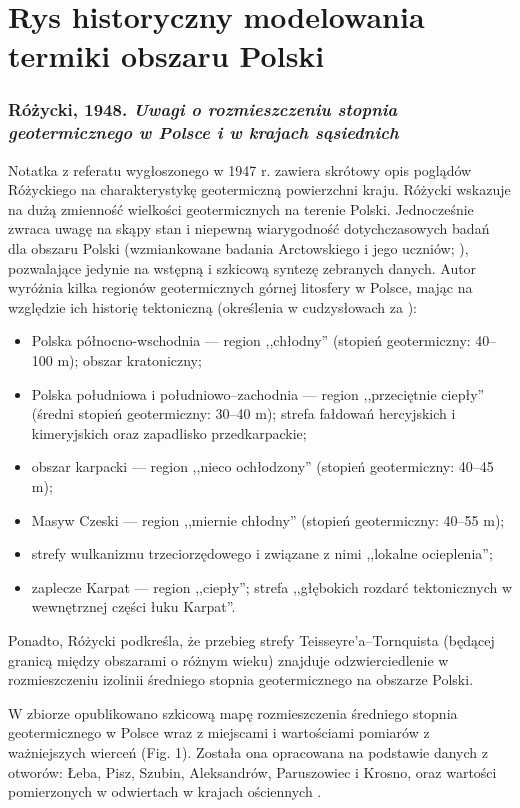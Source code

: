 \documentclass[11.5pt,twoside]{report}
\newcommand{\ct}[1]{\ignorespaces} %
\begin{document}
\section{Rys historyczny modelowania termiki obszaru Polski}

\subsubsection{Różycki, 1948. \textit{Uwagi o rozmieszczeniu stopnia geotermicznego w Polsce i w krajach sąsiednich}} \nocite{Rozycki.1948}
Notatka z referatu wygłoszonego w 1947 r. zawiera skrótowy opis poglądów Różyckiego na charakterystykę geotermiczną powierzchni kraju. Różycki wskazuje na dużą zmienność wielkości geotermicznych na terenie Polski. Jednocześnie zwraca uwagę na skąpy stan i niepewną wiarygodność dotychczasowych badań dla obszaru Polski (wzmiankowane badania Arctowskiego i jego uczniów; \ct{cite{bibid}}), pozwalające jedynie na wstępną i szkicową syntezę zebranych danych. Autor wyróżnia kilka regionów geotermicznych górnej litosfery w Polsce, mając na względzie ich historię tektoniczną (określenia w cudzysłowach za \cite{Rozycki.1948}):
 \begin{itemize}[nolistsep]
 	\item Polska północno-wschodnia --- region ,,chłodny'' (stopień geotermiczny: 40--100 m); obszar kratoniczny;
 	\item Polska południowa i południowo--zachodnia --- region ,,przeciętnie ciepły'' (średni stopień geotermiczny: 30--40 m); strefa fałdowań hercyjskich i kimeryjskich oraz zapadlisko przedkarpackie;
 	\item obszar karpacki --- region ,,nieco ochłodzony'' (stopień geotermiczny: 40--45 m);
 	\item Masyw Czeski --- region ,,miernie chłodny'' (stopień geotermiczny: 40--55 m);
 	\item strefy wulkanizmu trzeciorzędowego i związane z nimi ,,lokalne ocieplenia'';
 	\item zaplecze Karpat --- region ,,ciepły''; strefa ,,głębokich rozdarć tektonicznych w wewnętrznej części łuku Karpat''.
 \end{itemize}
Ponadto, Różycki podkreśla, że przebieg strefy Teisseyre'a--Tornquista (będącej granicą między obszarami o różnym wieku) znajduje odzwierciedlenie w rozmieszczeniu izolinii średniego stopnia geotermicznego na obszarze Polski.
 
W zbiorze opublikowano szkicową mapę rozmieszczenia średniego stopnia geotermicznego w Polsce wraz z miejscami i wartościami pomiarów z ważniejszych wierceń (Fig. 1). Została ona opracowana na podstawie danych z otworów: Łeba, Pisz, Szubin, Aleksandrów, Paruszowiec i Krosno, oraz wartości pomierzonych w odwiertach w krajach ościennych \parencite{Plewa.1966}.
	
\end{document}
